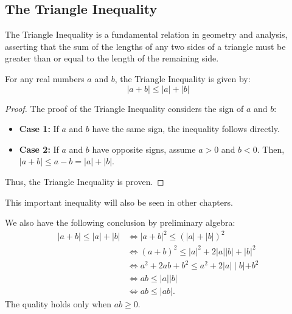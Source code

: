 \documentclass[
	12pt, %
	fleqn, %
	a4paper, %
]{LegrandOrangeBook}
\begin{document}
\subsection{The Triangle Inequality}
The Triangle Inequality is a fundamental relation in geometry and analysis, asserting that the sum of the lengths of any two sides of a triangle must be greater than or equal to the length of the remaining side.
    \begin{definition} \label{triangularineq}
        For any real numbers \( a \) and \( b \), the Triangle Inequality is given by:
        \[ |a + b| \leq |a| + |b| \]
    \end{definition}
    \begin{proof}
        The proof of the Triangle Inequality considers the sign of \( a \) and \( b \):
    \begin{itemize}
     \item \textbf{Case 1:} If \( a \) and \( b \) have the same sign, the inequality follows directly.
        \item \textbf{Case 2:} If \( a \) and \( b \) have opposite signs, assume \( a > 0 \) and \( b < 0      \). Then, \( |a + b| \leq a - b = |a| + |b| \).
    \end{itemize}
    Thus, the Triangle Inequality is proven.
    \end{proof}
    \begin{remark}
        This important inequality will also be seen in other chapters.
    \end{remark}
We also have the following conclusion by preliminary algebra:
$$
\begin{aligned}
    |a{+}b|{\leqslant}|a|+|b|& \Leftrightarrow|a{+}b|^2{\leqslant}(|a|{+}|b|)^2  \\
    &\Leftrightarrow(a+b)^2\leqslant|a|^2+2|a||b|+|b|^2 \\
    &\Leftrightarrow a^2+2ab+b^2\leqslant a^2+2|a|\mid b|+b^2 \\
    &\Leftrightarrow ab{\leqslant}|a|\left|b\right| \\
    &\Leftrightarrow ab\leqslant\lvert ab\rvert.
    \end{aligned}
$$
The quality holds only when $ab \geq 0$.
\end{document}
